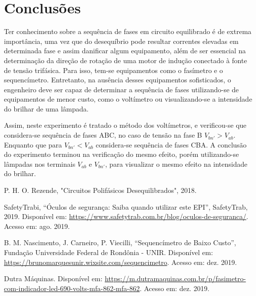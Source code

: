 \documentclass[a4paper,12pt,oneside,openany,table,xcdraw]{article}
\begin{document}
\section{Conclusões} %
Ter conhecimento sobre a sequência de fases em circuito equilibrado é de extrema importância, uma vez que do desequíbrio pode resultar correntes elevadas em determinada fase e assim danificar algum equipamento, além de ser essencial na determinação da direção de rotação de uma motor de indução
conectado à fonte de tensão trifásica. Para isso, tem-se equipamentos como o fasímetro e o sequencímetro. Entretanto, na ausência desses equipamentos sofisticados, o engenheiro deve ser capaz de determinar a sequência de fases utilizando-se de equipamentos de menor custo, como o voltímetro ou visualizando-se a intensidade do brilhar de uma lâmpada.

Assim, neste experimento é tratado o método dos voltímetros, e verificou-se que considera-se sequência de fases ABC, no caso de tensão na fase B $V_{bn'}>V_{ab}$. Enquanto que para $V_{bn'}<V_{ab}$ considera-se sequência de fases CBA. A conclusão do experimento terminou na verificação do mesmo efeito, porém utilizando-se lâmpadas nos terminais $V_{ab}$ e $V_{bn'}$, para visualizar o mesmo efeito na intensidade do brilhar.

\newpage
\begin{thebibliography}{9} 
    P. H. O. Rezende,
    "Circuitos Polifásicos Desequilibrados", 2018.

    SafetyTrabi,
    “Óculos de segurança: Saiba quando utilizar este EPI”, SafetyTrab, 2019.
 Disponível em:
 \url{https://www.safetytrab.com.br/blog/oculos-de-seguranca/}. Acesso em: ago. 2019.

    B. M. Nascimento, J. Carneiro, P. Viecilli,
    “Sequencímetro de Baixo Custo”, Fundação Universidade Federal de Rondônia - UNIR.
 Disponível em:
 \url{https://brunomarquesunir.wixsite.com/sequencimetro}. Acesso em: dez. 2019.

    Dutra Máquinas.
 Disponível em:
 \url{https://m.dutramaquinas.com.br/p/fasimetro-com-indicador-led-690-volts-mfa-862-mfa-862}. Acesso em: dez. 2019.


\end{thebibliography}
\end{document}
